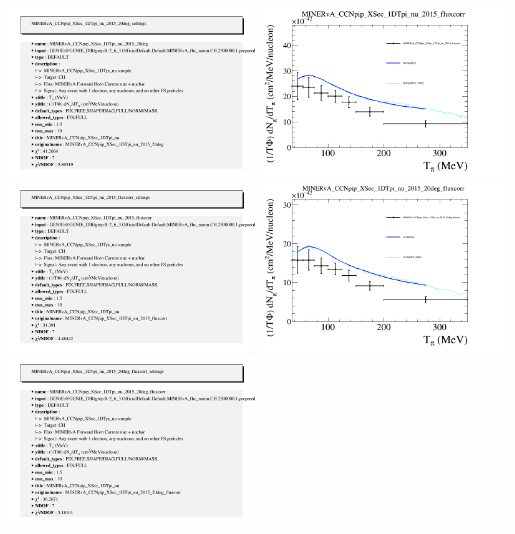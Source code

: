 \documentclass{article}
\begin{document}
\includegraphics[width=0.49\textwidth]{figures/nuisance_MINERvA_CCNpip_XSec_1DTpi_nu_2015_20deg_info.png}
\centering
\includegraphics[width=0.49\textwidth]{figures/nuisance_MINERvA_CCNpip_XSec_1DTpi_nu_2015_fluxcorr_comp.png}
\includegraphics[width=0.49\textwidth]{figures/nuisance_MINERvA_CCNpip_XSec_1DTpi_nu_2015_fluxcorr_info.png}
\centering
\includegraphics[width=0.49\textwidth]{figures/nuisance_MINERvA_CCNpip_XSec_1DTpi_nu_2015_20deg_fluxcorr_comp.png}
\includegraphics[width=0.49\textwidth]{figures/nuisance_MINERvA_CCNpip_XSec_1DTpi_nu_2015_20deg_fluxcorr_info.png}
\end{document}
